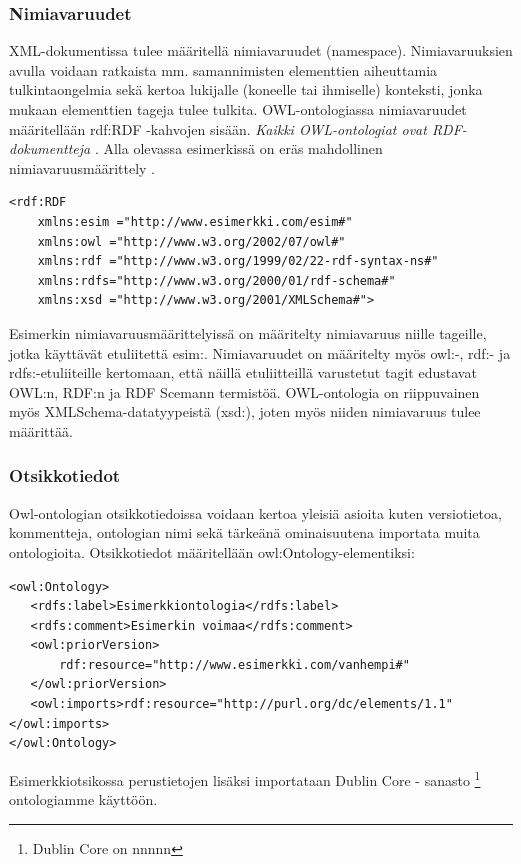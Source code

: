 \documentclass[finnish]{tktltiki2}
\theoremstyle{definition}
\theoremstyle{remark}
\begin{document}
\subsubsection{Nimiavaruudet}
XML-dokumentissa tulee määritellä nimiavaruudet (namespace). Nimiavaruuksien
avulla voidaan ratkaista mm. samannimisten elementtien aiheuttamia
tulkintaongelmia sekä kertoa lukijalle (koneelle tai ihmiselle) konteksti, jonka
mukaan elementtien tageja tulee tulkita. OWL-ontologiassa nimiavaruudet
määritellään rdf:RDF -kahvojen sisään. \textit{Kaikki OWL-ontologiat ovat RDF-dokumentteja} \cite{SWM04}. Alla olevassa esimerkissä on eräs mahdollinen nimiavaruusmäärittely . 
\begin{verbatim}
<rdf:RDF 
    xmlns:esim ="http://www.esimerkki.com/esim#" 
    xmlns:owl ="http://www.w3.org/2002/07/owl#"
    xmlns:rdf ="http://www.w3.org/1999/02/22-rdf-syntax-ns#"
    xmlns:rdfs="http://www.w3.org/2000/01/rdf-schema#"
    xmlns:xsd ="http://www.w3.org/2001/XMLSchema#">
\end{verbatim}
Esimerkin nimiavaruusmäärittelyissä on määritelty nimiavaruus niille tageille, jotka käyttävät etuliitettä esim:. 
Nimiavaruudet on määritelty myös owl:-, rdf:- ja rdfs:-etuliiteille kertomaan, että näillä
etuliitteillä varustetut tagit edustavat OWL:n, RDF:n ja RDF Scemann termistöä.
OWL-ontologia on riippuvainen myös XMLSchema-datatyypeistä (xsd:), joten myös niiden
nimiavaruus tulee määrittää. 

\subsubsection{Otsikkotiedot}
Owl-ontologian otsikkotiedoissa voidaan kertoa yleisiä asioita kuten versiotietoa, kommentteja, ontologian nimi sekä
tärkeänä ominaisuutena importata muita ontologioita. Otsikkotiedot määritellään owl:Ontology-elementiksi: 
\begin{verbatim}
<owl:Ontology>
   <rdfs:label>Esimerkkiontologia</rdfs:label>
   <rdfs:comment>Esimerkin voimaa</rdfs:comment>
   <owl:priorVersion>
       rdf:resource="http://www.esimerkki.com/vanhempi#"
   </owl:priorVersion>
   <owl:imports>rdf:resource="http://purl.org/dc/elements/1.1"</owl:imports>
</owl:Ontology>
\end{verbatim}
Esimerkkiotsikossa perustietojen lisäksi importataan Dublin Core - sanasto  \footnote{Dublin Core on nnnnn}  ontologiamme käyttöön.
\end{document}

